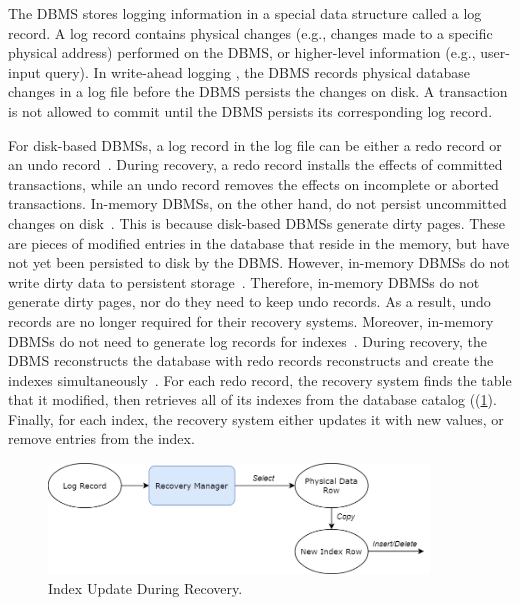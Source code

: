 \documentclass[12pt]{cmuthesis}
\begin{document}
The DBMS stores logging information in a special data structure called a log record. A log record contains physical changes (e.g., changes made to a specific physical address) performed on the DBMS, or higher-level information (e.g., user-input query). In write-ahead logging \cite{aries}, the DBMS records physical database changes in a log file before the DBMS persists the changes on disk. A transaction is not allowed to commit until the DBMS persists its corresponding log record.

For disk-based DBMSs, a log record in the log file can be either a redo record or an undo record~\cite{aries}. During recovery, a redo record installs the effects of committed transactions, while an undo record removes the effects on incomplete or aborted transactions. In-memory DBMSs, on the other hand, do not persist uncommitted changes on disk~\cite{noisepage, malviya14, hekaton2013, scuba14, silo_r}. This is because disk-based DBMSs generate dirty pages. These are pieces of modified entries in the database that reside in the memory, but have not yet been persisted to disk by the DBMS. However, in-memory DBMSs do not write dirty data to persistent storage~\cite{noisepage, malviya14, hekaton2013, scuba14, silo_r}. Therefore, in-memory DBMSs do not generate dirty pages, nor do they need to keep undo records. As a result, undo records are no longer required for their recovery systems. Moreover, in-memory DBMSs do not need to generate log records for indexes~\cite{faeber17}. During recovery, the DBMS reconstructs the database with redo records reconstructs and create the indexes simultaneously~\cite{malviya14, hekaton2013}. For each redo record, the recovery system finds the table that it modified, then retrieves all of its indexes from the database catalog ((\cref{fig:recovery_index_update}). Finally, for each index, the recovery system either updates it with new values, or remove entries from the index. 

\begin{figure}[t!]
\centering
\centering
\includegraphics[width=0.9\textwidth]{images/RecoverIndex.png}
\caption{Index Update During Recovery.}
 \label{fig:recovery_index_update}
\end{figure}
\end{document}
